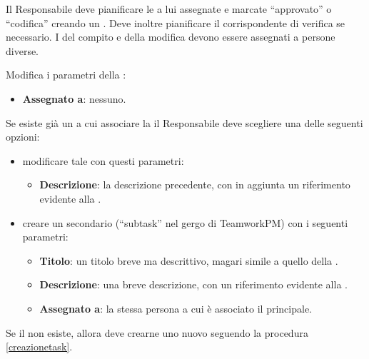 Il Responsabile deve pianificare le  a lui assegnate e marcate ``approvato'' o ``codifica'' creando un . Deve inoltre pianificare il corrispondente  di verifica se necessario. I  del compito e della modifica devono essere assegnati a persone diverse.

Modifica i parametri della :
\begin{itemize}
 \item \textbf{Assegnato a}: nessuno.
\end{itemize}

Se esiste già un  a cui associare la  il Responsabile deve scegliere una delle seguenti opzioni:
\begin{itemize}
 \item modificare tale  con questi parametri:
	\begin{itemize}
		\item \textbf{Descrizione}: la descrizione precedente, con in aggiunta un riferimento evidente alla .
	\end{itemize}
 \item creare un  secondario (``subtask'' nel gergo di TeamworkPM) con i seguenti parametri:
	\begin{itemize}
		\item \textbf{Titolo}: un titolo breve ma descrittivo, magari simile a quello della .
		\item \textbf{Descrizione}: una breve descrizione, con un riferimento evidente alla .
		\item \textbf{Assegnato a}: la stessa persona a cui è associato il  principale.
	\end{itemize}
\end{itemize}

Se il  non esiste, allora deve crearne uno nuovo seguendo la procedura \ref{creazionetask}.

